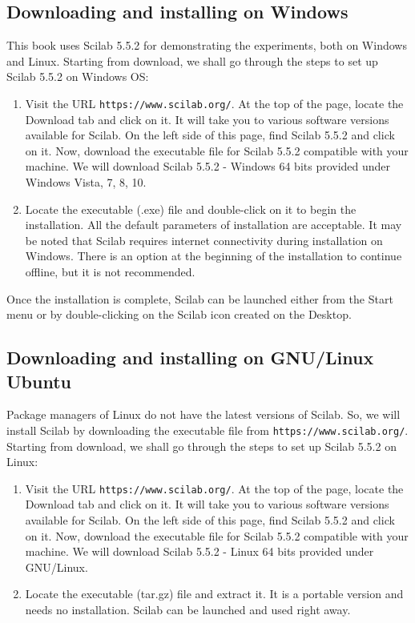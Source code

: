 \subsection{Downloading and installing on Windows}\label{scilab-installation-windows}
This book uses Scilab 5.5.2 for demonstrating the experiments, 
both on Windows and Linux. Starting from download, we shall go through 
the steps to set up Scilab 5.5.2 on Windows OS:

\begin{enumerate}
      \item Visit the URL {\tt https://www.scilab.org/}. 
      At the top of the page, locate the Download tab and click on it. 
      It will take you to various software versions available for Scilab. 
      On the left side of this page, find Scilab 5.5.2 and click on it. 
      Now, download the executable file for Scilab 5.5.2 compatible with your machine. 
      We will download Scilab 5.5.2 - Windows 64 bits provided under 
      Windows Vista, 7, 8, 10. 
      \item Locate the executable (.exe) file and double-click on it to 
      begin the installation. All the default parameters of installation 
      are acceptable. It may be noted that Scilab requires internet 
      connectivity during installation on Windows. There is an option 
      at the beginning of the installation to continue offline, 
      but it is not recommended. 
\end{enumerate}

Once the installation is complete, Scilab can be launched either from the 
Start menu or by double-clicking on the Scilab icon created on the Desktop. 

\subsection{Downloading and installing on GNU/Linux Ubuntu}\label{scilab-installation-linux}

Package managers of Linux do not have the latest versions of Scilab. 
So, we will install Scilab by downloading the executable file 
from {\tt https://www.scilab.org/}. Starting from download, we shall go 
through the steps to set up Scilab 5.5.2 on Linux: 

\begin{enumerate}
      \item Visit the URL {\tt https://www.scilab.org/}. At the top of the page, 
      locate the Download tab and click on it. It will take you to various 
      software versions available for Scilab. On the left side of this page, 
      find Scilab 5.5.2 and click on it. Now, download the executable file for Scilab 5.5.2 
      compatible with your machine.  We will download Scilab 5.5.2 - Linux 64 bits provided under GNU/Linux.  
      \item Locate the executable (tar.gz) file and extract it. 
      It is a portable version and needs no installation. 
      Scilab can be launched and used right away.
\end{enumerate}

